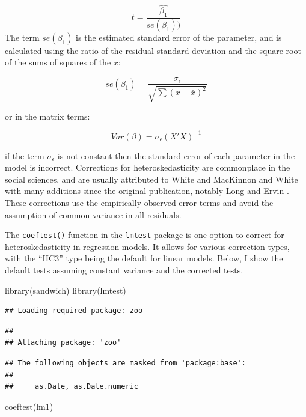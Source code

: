 \documentclass[
]{article}
\newenvironment{Shaded}{\begin{snugshade}}{\end{snugshade}}
\newcommand{\FunctionTok}[1]{\textcolor[rgb]{0.00,0.00,0.00}{#1}}
\newcommand{\NormalTok}[1]{#1}
\begin{document}
\[t = \frac{\hat{\beta_1}}{se(\beta_1))}\]
The term \(se(\beta_1)\) is the estimated standard error of the parameter, and is calculated using the ratio of the residual standard deviation and the square root of the sums of squares of the \(x\):

\[se(\beta_1) = \frac{\sigma_{\epsilon}}{\sqrt{\sum(x - \bar{x})^2}}\]

or in the matrix terms:

\[Var(\beta) = \sigma_{\epsilon}(X'X)^{-1}\]

if the term \(\sigma_{\epsilon}\) is not constant then the standard error of each parameter in the model is incorrect. Corrections for heteroskedasticity are commonplace in the social sciences, and are usually attributed to White \citeyearpar{white_1980} and MacKinnon and White \citeyearpar{mackinnon_white_1985} with many additions since the original publication, notably Long and Ervin \citeyearpar{long_using_2000}. These corrections use the empirically observed error terms and avoid the assumption of common variance in all residuals.

The \texttt{coeftest()} function in the \texttt{lmtest} package is one option to correct for heteroskedasticity in regression models. It allows for various correction types, with the ``HC3'' type \citep{long_using_2000} being the default for linear models. Below, I show the default tests assuming constant variance and the corrected tests.

\begin{Shaded}
\begin{Highlighting}[]
\FunctionTok{library}\NormalTok{(sandwich)}
\FunctionTok{library}\NormalTok{(lmtest)}
\end{Highlighting}
\end{Shaded}

\begin{verbatim}
## Loading required package: zoo
\end{verbatim}

\begin{verbatim}
## 
## Attaching package: 'zoo'
\end{verbatim}

\begin{verbatim}
## The following objects are masked from 'package:base':
## 
##     as.Date, as.Date.numeric
\end{verbatim}

\begin{Shaded}
\begin{Highlighting}[]
\FunctionTok{coeftest}\NormalTok{(lm1)}
\end{Highlighting}
\end{Shaded}
\end{document}
